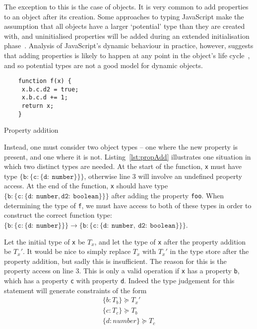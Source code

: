 \documentclass[12pt,a4paper,twoside,openright]{report}
\newcommand*{\js}{\texttt}
\begin{document}
The exception to this is the case of objects. It is very common to add
properties to an object after its creation. Some approaches to typing
JavaScript make the assumption that all objects have a larger `potential' type
than they are created with, and uninitialised properties will be added during
an extended initialisation phase~\cite{anderson05}. Analysis of JavaScript's
dynamic behaviour in practice, however, suggests that adding properties is
likely to happen at any point in the object's life cycle~\cite{JSBehaviour},
and so potential types are not a good model for dynamic objects.
\begin{program}[ht]
 \centering
 \begin{minipage}[b]{0.45\linewidth}
 	\begin{verbatim}
	function f(x) {
	 x.b.c.d2 = true;
	 x.b.c.d += 1;
	 return x;
	}	
 	\end{verbatim}
 	\vspace{23mm}
 \end{minipage}
 \quad
 \begin{minipage}[b]{0.45\linewidth}
 \end{minipage}
 \caption{Property addition}\label{lst:propAdd}
\end{program}

Instead, one must consider two object types -- one where the new property is
present, and one where it is not. Listing~\ref{lst:propAdd} illustrates one
situation in which two distinct types are needed. At the start of the function,
\js{x} must have type $\mathtt{\{b:\{c:\{d:\ number\}\}\}}$, otherwise line 3 will involve
an undefined property access. At the end of the function, \js{x} should
have type $\mathtt{\{b:\{c:\{d:\ number, d2:\ boolean\}\}\}}$ after adding the property
\js{foo}. When determining the type of \js{f}, we must have access to
both of these types in order to construct the correct function type:
$\mathtt{\{b:\{c:\{d:\ number\}\}\} \rightarrow \{b:\{c:\{d:\ number,\ d2:\ boolean\}\}\}}$.

Let the initial type of \js{x} be $T_x$, and let the type of \js{x}
after the property addition be $T_x'$. It would be nice to simply replace $T_x$
with $T_x'$ in the type store after the property addition, but sadly this is
insufficient. The reason for this is the property access on line 3. This is
only a valid operation if \js{x} has a property \js{b}, which has a
property \js{c} with property \js{d}. Indeed the type judgement for
this statement will generate constraints of the form 
\begin{equation}
 \begin{split}
 \label{eq:barC}
 \{b:T_b\} \succeq T_x' \\
 \{c:T_c\} \succeq T_b \\
 \{d:number\} \succeq T_c \\
\end{split}
\end{equation}
\end{document}
